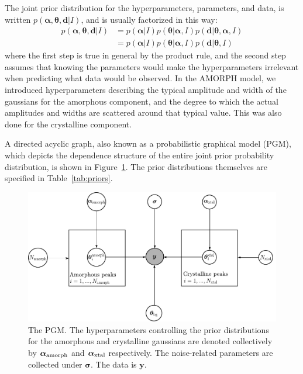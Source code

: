 \documentclass[preprint, a4paper]{elsarticle}
\newcommand{\hypers}{\boldsymbol{\alpha}}
\newcommand{\params}{\boldsymbol{\theta}}
\newcommand{\data}{\boldsymbol{d}}
\newcommand{\info}{I}
\begin{document}
The joint prior distribution for
the hyperparameters, parameters, and data,
is written $p(\hypers, \params, \data | \info)$, and is usually factorized
in this way:
\begin{align}
p(\hypers, \params, \data | \info) &=
    p(\hypers | \info)p(\params | \hypers, \info)
    p(\data | \params, \hypers, \info)\\
    &= p(\hypers | \info)p(\params | \hypers, \info)
    p(\data | \params, \info)
\end{align}
where the first step is true in general by the product rule, and the second
step assumes that knowing the parameters would make the hyperparameters
irrelevant when predicting what data would be observed. In the AMORPH model,
we introduced hyperparameters describing the typical amplitude
and width of the gaussians for the amorphous component, and
the degree to which the actual amplitudes and widths are scattered
around that typical value. This was also done for the crystalline
component.

A directed acyclic graph, also known as a probabilistic graphical model (PGM),
which depicts the dependence structure of the entire joint
prior probability distribution,
is shown in Figure~\ref{fig:pgm-edited}. The prior distributions themselves
are specified in Table~\ref{tab:priors}.

\begin{figure}[!ht]
\centering
\includegraphics[scale=0.7]{figures/pgm-edited.pdf}
\caption{The PGM. The hyperparameters controlling the prior distributions
for the amorphous and crystalline gaussians are denoted collectively
by $\boldsymbol{\alpha}_{\rm amorph}$ and
$\boldsymbol{\alpha}_{\rm xtal}$ respectively.
The noise-related parameters are collected under $\boldsymbol{\sigma}$.
The data is $\boldsymbol{y}$.\label{fig:pgm-edited}}
\end{figure}
\end{document}
